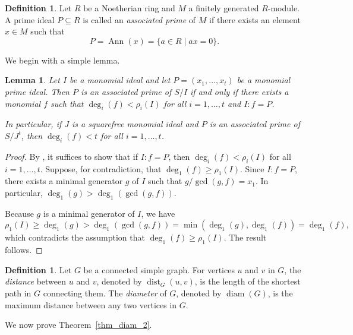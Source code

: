 \documentclass[12pt,reqno,twoside]{amsart}
\DeclareMathOperator{\diam}{diam}
\DeclareMathOperator{\Ann}{Ann}
\DeclareMathOperator{\dist}{dist}
\newtheorem{lem}[thm]{\bf Lemma}
\theoremstyle{definition}
\newtheorem{defn}[thm]{\bf Definition}
\theoremstyle{plain}
\theoremstyle{remark}
\numberwithin{equation}{section}
\begin{document}
\begin{defn}
Let $R$ be a Noetherian ring and $M$ a finitely generated $R$-module. A prime ideal $P \subseteq R$ is called an \emph{associated prime} of $M$ if there exists an element $x \in M$ such that
\[
P = \Ann(x) = \{ a \in R \mid ax = 0 \}.
\]
\end{defn}

We begin with a simple lemma.

\begin{lem}\label{lem_quotient}
Let $I$ be a monomial ideal and let $P = (x_1, \ldots, x_t)$ be a monomial prime ideal. Then $P$ is an associated prime of $S/I$ if and only if there exists a monomial $f$ such that $\deg_i(f) < \rho_i(I)$ for all $i = 1, \ldots, t$ and $I : f = P$. 

In particular, if $J$ is a squarefree monomial ideal and $P$ is an associated prime of $S/J^t$, then $\deg_i(f) < t$ for all $i = 1, \ldots, t$.
\end{lem}

\begin{proof}
By \cite[Corollary 1.3.10]{HH}, it suffices to show that if $I : f = P$, then $\deg_i(f) < \rho_i(I)$ for all $i = 1, \ldots, t$. Suppose, for contradiction, that $\deg_1(f) \geq \rho_1(I)$. Since $I : f = P$, there exists a minimal generator $g$ of $I$ such that $g / \gcd(g, f) = x_1$. In particular, $\deg_1(g) > \deg_1(\gcd(g, f))$. 

Because $g$ is a minimal generator of $I$, we have
\[
\rho_1(I) \geq \deg_1(g) > \deg_1(\gcd(g, f)) = \min(\deg_1(g), \deg_1(f)) = \deg_1(f),
\]
which contradicts the assumption that $\deg_1(f) \geq \rho_1(I)$. The result follows.
\end{proof}


\begin{defn}
Let $G$ be a connected simple graph. For vertices $u$ and $v$ in $G$, the \emph{distance} between $u$ and $v$, denoted by $\dist_G(u, v)$, is the length of the shortest path in $G$ connecting them. The \emph{diameter} of $G$, denoted by $\diam(G)$, is the maximum distance between any two vertices in $G$.
\end{defn}


We now prove Theorem~\ref{thm_diam_2}.
\end{document}
